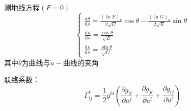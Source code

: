 \documentclass{article}                     %
\numberwithin{equation}{section}            %
\numberwithin{figure}{section}              %
\numberwithin{table}{section}               %
\begin{document}
测地线方程$(F=0)$
\begin{equation*}
    \left\{\begin{matrix}
        \frac{\mathrm{d} \theta }{\mathrm{d} s}=\frac{(\ln {E})_v}{2\sqrt{G} }\cos {\theta }-\frac{(\ln {G})_u}{2\sqrt{E} }\sin {\theta }  \\
        \frac{\mathrm{d} u }{\mathrm{d} s}=\frac{\cos {\theta }}{\sqrt{E} } \\
        \frac{\mathrm{d} v }{\mathrm{d} s}=\frac{\sin {\theta }}{\sqrt{G} }
       \end{matrix}\right.
\end{equation*}
其中$\theta$为曲线与$u-$曲线的夹角

联络系数：
\begin{equation*}
    \Gamma _{ij}^k=\frac{1}{2}g^{kl}(\frac{\partial g_{il}}{\partial u^j}+\frac{\partial g_{jl}}{\partial u^i}+\frac{\partial g_{ij}}{\partial u^l} ) 
\end{equation*}
\end{document}
